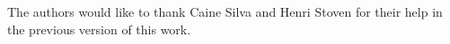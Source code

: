 \documentclass[sigconf]{acmart}
\begin{document}


\maketitle









%





\begin{acks}
The authors would like to thank Caine Silva and Henri Stoven for their help in the previous version of this work.
\end{acks}

\newpage


\end{document}
